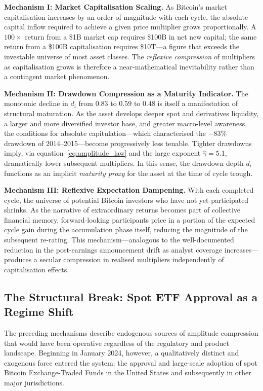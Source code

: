 \textbf{Mechanism I: Market Capitalisation Scaling.} As Bitcoin's market
capitalisation increases by an order of magnitude with each cycle, the absolute
capital inflow required to achieve a given price multiplier grows
proportionally. A $100\times$ return from a \$1B market cap requires \$100B
in net new capital; the same return from a \$100B capitalisation requires
\$10T---a figure that exceeds the investable universe of most asset classes. The
\textit{reflexive compression} of multipliers as capitalisation grows is
therefore a near-mathematical inevitability rather than a contingent market
phenomenon.

\textbf{Mechanism II: Drawdown Compression as a Maturity Indicator.} The
monotonic decline in $d_i$ from $0.83$ to $0.59$ to $0.48$ is itself a
manifestation of structural maturation. As the asset develops deeper spot and
derivatives liquidity, a larger and more diversified investor base, and
greater macro-level awareness, the conditions for absolute capitulation---which
characterised the $-83\%$ drawdown of 2014--2015---become progressively less
tenable. Tighter drawdowns imply, via equation~\eqref{eq:amplitude_law} and
the large exponent $\hat{\gamma}=5.1$, dramatically lower subsequent
multipliers. In this sense, the drawdown depth $d_i$ functions as an implicit
\textit{maturity proxy} for the asset at the time of cycle trough.

\textbf{Mechanism III: Reflexive Expectation Dampening.} With each completed
cycle, the universe of potential Bitcoin investors who have not yet participated
shrinks. As the narrative of extraordinary returns becomes part of collective
financial memory, forward-looking participants price in a portion of the
expected cycle gain during the accumulation phase itself, reducing the
magnitude of the subsequent re-rating. This mechanism---analogous to the
well-documented reduction in the post-earnings announcement drift as analyst
coverage increases---produces a secular compression in realised multipliers
independently of capitalisation effects.

\subsection{The Structural Break: Spot ETF Approval as a Regime Shift}
\label{sec:etf_break}

The preceding mechanisms describe endogenous sources of amplitude compression
that would have been operative regardless of the regulatory and product
landscape. Beginning in January 2024, however, a qualitatively distinct and
exogenous force entered the system: the approval and large-scale adoption of
spot Bitcoin Exchange-Traded Funds in the United States and subsequently in
other major jurisdictions.

